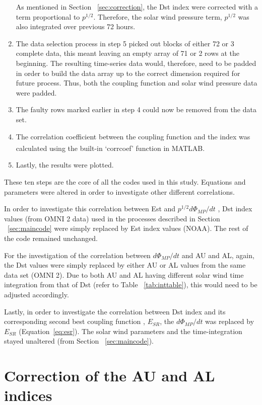 \documentclass[12pt]{report} %
\begin{document}
\begin{enumerate}
 As mentioned in Section ~\ref{sec:correction}, the Dst index were corrected with a term proportional to $p^{1/2}$. Therefore, the solar wind pressure term, $p^{1/2}$ was also integrated over previous 72 hours. 
\item The data selection process in step 5 picked out blocks of either 72 or 3 complete data, this meant leaving an empty array of 71 or 2 rows at the beginning. The resulting time-series data would, therefore, need to be padded in order to build the data array up to the correct dimension required for future process. Thus, both the coupling function and solar wind pressure data were padded. 
\item The faulty rows marked earlier in step 4 could now be removed from the data set. 
\item The correlation coefficient between the coupling function and the index was calculated using the built-in `corrcoef' function in MATLAB\textsuperscript{\textregistered}.  
\item Lastly, the results were plotted.
\end{enumerate}
\noindent These ten steps are the core of all the codes used in this study. Equations and parameters were altered in order to investigate other different correlations. 

In order to investigate this correlation between Est and  $p^{1/2}d\Phi_{MP}/dt$ , Dst index values (from OMNI 2 data) used in the processes described in Section ~\ref{sec:maincode} were simply replaced by Est index values (NOAA). The rest of the code remained  unchanged. 

For the investigation of the correlation between $d\Phi_{MP}/dt$ and AU and AL, again, the Dst values were simply replaced by either AU or AL values from the same data set (OMNI 2). Due to both AU and AL having different solar wind time integration from that of Dst (refer to Table ~\ref{tab:inttable}), this would need to be adjusted accordingly. 

Lastly, in order to investigate the correlation between Dst index and its corresponding second best coupling function \citep{newell07}, $E_{SR}$, the $d\Phi_{MP}/dt$ was replaced by $E_{SR}$ (Equation~\ref{eq:esr}). The solar wind parameters and the time-integration stayed unaltered (from Section ~\ref{sec:maincode}). 

\vspace{-10pt}
\section{Correction of the AU and AL indices} \label{sec:correctaual}
\vspace{-10pt}
\end{document}
